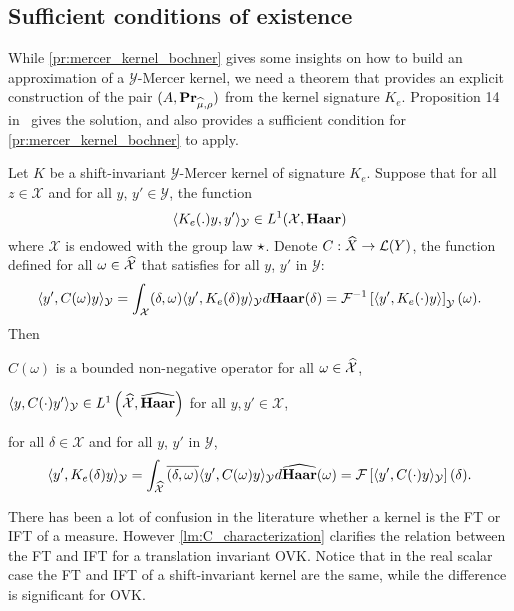 \subsection{Sufficient conditions of existence}
\label{subsec:sufficient_conditions}
While \cref{pr:mercer_kernel_bochner} gives some insights on how to build an
approximation of a $\mathcal{Y}$-Mercer kernel, we need a theorem that provides
an explicit construction of the pair $(A, {\mathbf{{Pr}}}_{\widehat{\mu},\rho})$ from
the kernel signature $K_e$. Proposition 14 in~\citet{Carmeli2010} gives the
solution, and also provides a sufficient condition for
\cref{pr:mercer_kernel_bochner} to apply.
\begin{proposition}
    \label{pr:inverse_ovk_Fourier_decomposition}
    Let $K$ be a shift-invariant $\mathcal{Y}$-Mercer kernel of signature $K_e$. %
    Suppose that for all $z \in \mathcal{X}$ and for all $y$, $y'
    \in\mathcal{Y}$, the function
    \begin{dmath*}
        \inner{K_e(.)y,y'}_{\mathcal{Y}}\in L^1(\mathcal{X},\Haar)
    \end{dmath*}
    where $\mathcal{X}$ is endowed with the group law $\star$. Denote $C:
    \widehat{X} \to \mathcal{L}(Y)$, the function defined for all $\omega \in
    \widehat{\mathcal{X}}$ that satisfies for all $y$, $y'$ in $\mathcal{Y}$:
    \begin{dmath}\label{eq:CK0}
        \inner{y',C(\omega)y}_{\mathcal{Y}}= \int_{\mathcal{X}}
        \pairing{\delta, \omega}\inner{y',
        K_e(\delta)y}_{\mathcal{Y}}d\Haar(\delta) = \IFT{\inner{y',
        K_e(\cdot)y}}_{\mathcal{Y}}(\omega).
    \end{dmath}
    Then
    \begin{propenum}
        \item $C(\omega)$ is a bounded non-negative operator for all $\omega
        \in \widehat{\mathcal{X}}$, 
        \item $\langle y, C(\cdot)y'\rangle_{\mathcal{Y}}\in
        L^1\left(\widehat{\mathcal{X}},\widehat{\mathbf{Haar}}\right)$ for all
        $y,y'\in\mathcal{X}$,
        \item for all $\delta\in\mathcal{X}$ and for all $y$, $y'$ in
        $\mathcal{Y}$,
        \begin{dmath*}
            \inner{y', K_e(\delta)y}_{\mathcal{Y}}=
            \int_{\dual{\mathcal{X}}}\conj{\pairing{\delta,\omega}}\inner{y',
            C(\omega)y}_{\mathcal{Y}}d\dual{\Haar}(\omega) =\FT{\inner{y',
            C(\cdot)y}_{\mathcal{Y}}}(\delta).
        \end{dmath*}
    \end{propenum}
\end{proposition}
There has been a lot of confusion in the literature whether a kernel is the
\acl{FT} or \acl{IFT} of a measure. However \cref{lm:C_characterization}
clarifies the relation between the \acl{FT} and \acl{IFT} for a translation
invariant \acl{OVK}. Notice that in the real scalar case the \acl{FT} and
\acl{IFT} of a shift-invariant kernel are the same, while the difference is
significant for \acs{OVK}.
